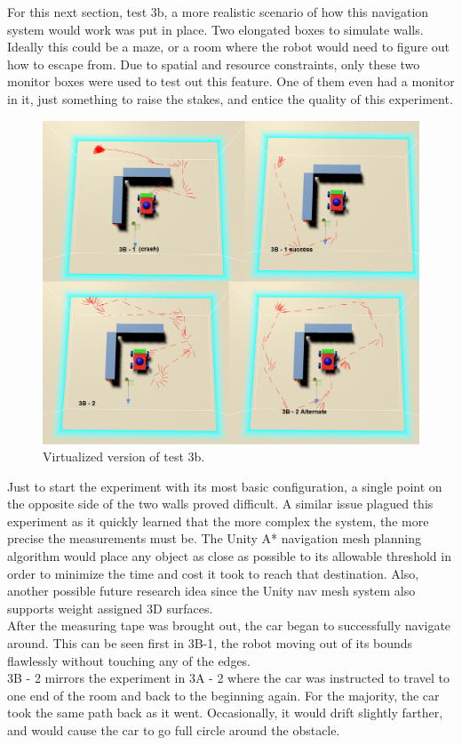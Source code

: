 \documentclass[10pt,a4paper]{article}
\begin{document}
	For this next section, test 3b, a more realistic scenario of how this navigation system would work was put in place. Two elongated boxes to simulate walls. Ideally this could be a maze, or a room where the robot would need to figure out how to escape from. Due to spatial and resource constraints, only these two monitor boxes were used to test out this feature. One of them even had a monitor in it, just something to raise the stakes, and entice the quality of this experiment.
	
	\begin{figure}
		\centering
		\includegraphics[width=.8\textwidth]{Test3_Visuals/Test3b_mosaic.png}
		\caption{Virtualized version of test 3b.}
		\label{fig:vis_comp_t3b}
	\end{figure}

	Just to start the experiment with its most basic configuration, a single point on the opposite side of the two walls proved difficult. A similar issue plagued this experiment as it quickly learned that the more complex the system, the more precise the measurements must be. The Unity A* navigation mesh planning algorithm would place any object as close as possible to its allowable threshold in order to minimize the time and cost it took to reach that destination. Also, another possible future research idea since the Unity nav mesh system also supports weight assigned 3D surfaces.
	\\
	After the measuring tape was brought out, the car began to successfully navigate around. This can be seen first in 3B-1, the robot moving out of its bounds flawlessly without touching any of the edges.
	\\
	3B - 2 mirrors the experiment in 3A - 2 where the car was instructed to travel to one end of the room and back to the beginning again. For the majority, the car took the same path back as it went. Occasionally, it would drift slightly farther, and would cause the car to go full circle around the obstacle.
	
\end{document}

